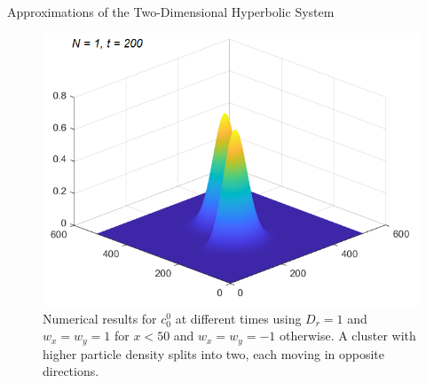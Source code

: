 \begin{frame}{Approximations of the Two-Dimensional Hyperbolic System}
\begin{figure}[H]
\begin{minipage}{0.4\textwidth}
				\includegraphics[scale=0.23]{Bilder_wxwy/t=200_wxwy=1_wxwy=-1}
			\end{minipage}
			\caption{Numerical results for $c^0_0$ at different times using $D_r=1$ and $w_x=w_y=1$ for $x<50$ and $w_x=w_y=-1$ otherwise. A cluster with higher particle density splits into two, each moving in opposite directions.}
		\end{figure}
\end{frame}

